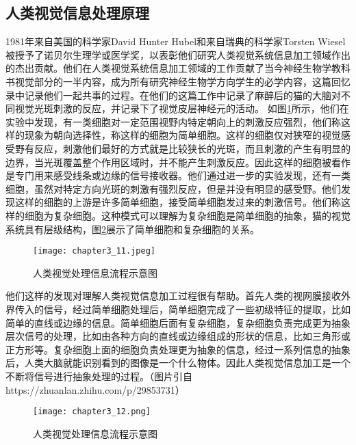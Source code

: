 \subsection{人类视觉信息处理原理}
1981年来自美国的科学家David Hunter Hubel和来自瑞典的科学家Torsten Wiesel被授予了诺贝尔生理学或医学奖，以表彰他们研究人类视觉系统信息加工领域作出的杰出贡献。他们在人类视觉系统信息加工领域的工作贡献了当今神经生物学教科书视觉部分的一半内容，成为所有研究神经生物学方向学生的必学内容，这篇回忆录\cite{Hubel1998EarlyEO}中记录他们一起共事的过程。在他们的这篇工作\cite{https://doi.org/10.1113/jphysiol.1959.sp006308}中记录了麻醉后的猫的大脑对不同视觉光斑刺激的反应，并记录下了视觉皮层神经元的活动。
如图\ref{fig:chapter3_11}所示，他们在实验中发现，有一类细胞对一定范围视野内特定朝向上的刺激反应强烈，他们称这样的现象为朝向选择性，称这样的细胞为简单细胞。这样的细胞仅对狭窄的视觉感受野有反应，刺激他们最好的方式就是比较狭长的光斑，而且刺激的产生有明显的边界，当光斑覆盖整个作用区域时，并不能产生刺激反应。因此这样的细胞被看作是专门用来感受线条或边缘的信号接收器。他们通过进一步的实验发现，还有一类细胞，虽然对特定方向光斑的刺激有强烈反应，但是并没有明显的感受野。他们发现这样的细胞的上游是许多简单细胞，接受简单细胞发过来的刺激信号。他们称这样的细胞为复杂细胞。这种模式可以理解为复杂细胞是简单细胞的抽象，猫的视觉系统具有层级结构，图\ref{fig:chapter3_12}展示了简单细胞和复杂细胞的关系。
\begin{figure}
    \centering
    \texttt{[image: chapter3\_11.jpeg]}
    \caption{人类视觉处理信息流程示意图}
    \label{fig:chapter3_11}
\end{figure}
他们这样的发现对理解人类视觉信息加工过程很有帮助。首先人类的视网膜接收外界传入的信号，经过简单细胞处理后，简单细胞完成了一些初级特征的提取，比如简单的直线或边缘的信息。简单细胞后面有复杂细胞，复杂细胞负责完成更为抽象层次信号的处理，比如由各种方向的直线或边缘组成的形状的信息，比如三角形或正方形等。复杂细胞上面的细胞负责处理更为抽象的信息，经过一系列信息的抽象后，人类大脑就能识别看到的图像是一个什么物体。因此人类视觉信息加工是一个不断将信号进行抽象处理的过程。（图片引自https://zhuanlan.zhihu.com/p/29853731）
\begin{figure}
    \centering
    \texttt{[image: chapter3\_12.png]}
    \caption{人类视觉处理信息流程示意图}
    \label{fig:chapter3_12}
\end{figure}

